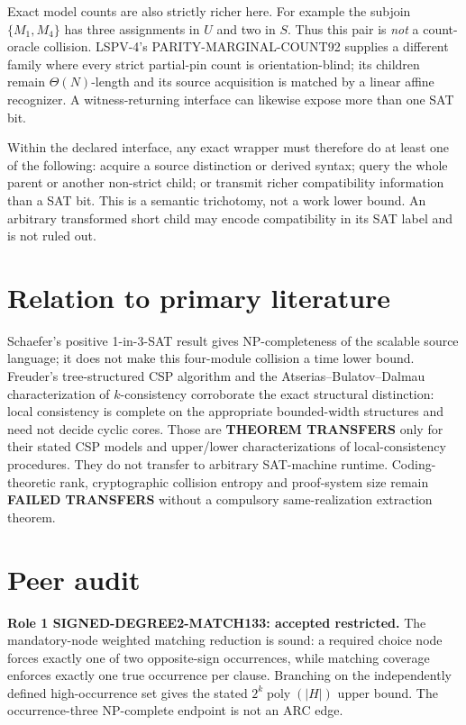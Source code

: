 \documentclass[11pt]{article}
\begin{document}
Exact model counts are also strictly richer here.  For example the subjoin
\(\{M_1,M_4\}\) has three assignments in \(U\) and two in \(S\).  Thus this
pair is \emph{not} a count-oracle collision.  LSPV-4's
PARITY-MARGINAL-COUNT92 supplies a different family where every strict
partial-pin count is orientation-blind; its children remain
\(\Theta(N)\)-length and its source acquisition is matched by a linear
affine recognizer.  A witness-returning interface can likewise expose more
than one SAT bit.

Within the declared interface, any exact wrapper must therefore do at least
one of the following: acquire a source distinction or derived syntax; query
the whole parent or another non-strict child; or transmit richer
compatibility information than a SAT bit.  This is a semantic trichotomy,
not a work lower bound.  An arbitrary transformed short child may encode
compatibility in its SAT label and is not ruled out.

\section{Relation to primary literature}
Schaefer's positive 1-in-3-SAT result gives NP-completeness of the scalable
source language; it does not make this four-module collision a time lower
bound.  Freuder's tree-structured CSP algorithm and the
Atserias--Bulatov--Dalmau characterization of \(k\)-consistency corroborate
the exact structural distinction: local consistency is complete on the
appropriate bounded-width structures and need not decide cyclic cores.
Those are \textbf{THEOREM TRANSFERS} only for their stated CSP models and
upper/lower characterizations of local-consistency procedures.  They do not
transfer to arbitrary SAT-machine runtime.  Coding-theoretic rank,
cryptographic collision entropy and proof-system size remain
\textbf{FAILED TRANSFERS} without a compulsory same-realization extraction
theorem.

\section{Peer audit}
\textbf{Role 1 SIGNED-DEGREE2-MATCH133: accepted restricted.}
The mandatory-node weighted matching reduction is sound: a required choice
node forces exactly one of two opposite-sign occurrences, while matching
coverage enforces exactly one true occurrence per clause.  Branching on the
independently defined high-occurrence set gives the stated
\(2^k\operatorname{poly}(|H|)\) upper bound.  The occurrence-three
NP-complete endpoint is not an ARC edge.
\end{document}
